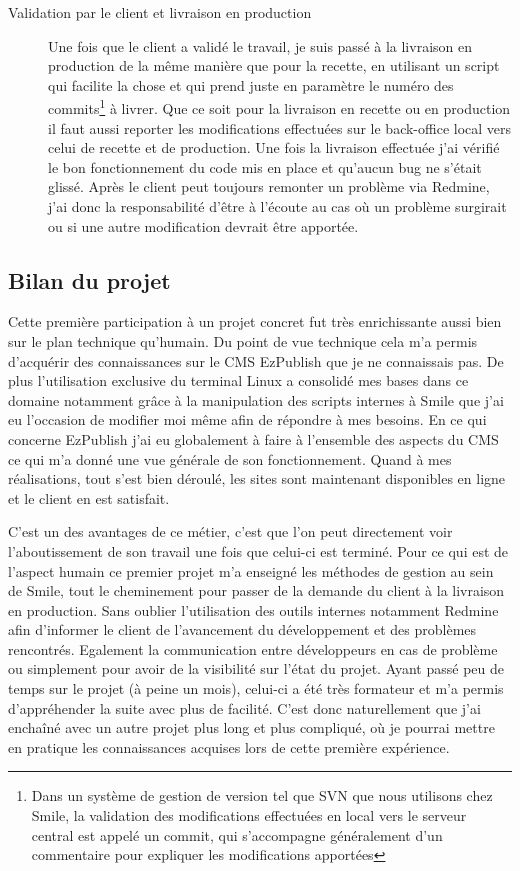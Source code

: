 \documentclass[a4paper,11pt,twoside]{report}
\begin{document}
\begin{description}
	\item[Validation par le client et livraison en production] Une fois que le client a validé le travail, je suis passé à la livraison en production de la même manière que pour la recette, en utilisant un script qui facilite la chose et qui prend juste en paramètre le numéro des commits\footnote{Dans un système de gestion de version tel que SVN que nous utilisons chez Smile, la validation des modifications effectuées en local vers le serveur central est appelé un commit, qui s'accompagne généralement d'un commentaire pour expliquer les modifications apportées} à livrer. Que ce soit pour la livraison en recette ou en production il faut aussi reporter les modifications effectuées sur le back-office local vers celui de recette et de production. Une fois la livraison effectuée j'ai vérifié le bon fonctionnement du code mis en place et qu'aucun bug ne s'était glissé. Après le client peut toujours remonter un problème via Redmine, j'ai donc la responsabilité d'être à l'écoute au cas où un problème surgirait ou si une autre modification devrait être apportée.  
      
      \end{description}
    \subsection*{Bilan du projet}
    Cette première participation à un projet concret fut très enrichissante aussi bien sur le plan technique qu'humain. Du point de vue technique cela m'a permis d'acquérir des connaissances sur le CMS EzPublish que je ne connaissais pas. De plus l'utilisation exclusive du terminal Linux a consolidé mes bases dans ce domaine notamment grâce à la manipulation des scripts internes à Smile que j'ai eu l'occasion de modifier moi même afin de répondre à mes besoins. En ce qui concerne EzPublish j'ai eu globalement à faire à l'ensemble des aspects du CMS ce qui m'a donné une vue générale de son fonctionnement. Quand à mes réalisations, tout s'est bien déroulé, les sites sont maintenant disponibles en ligne et le client en est satisfait. 
    
    C'est un des avantages de ce métier, c'est que l'on peut directement voir l'aboutissement de son travail une fois que celui-ci est terminé. Pour ce qui est de l'aspect humain ce premier projet m'a enseigné les méthodes de gestion au sein de Smile, tout le cheminement pour passer de la demande du client à la livraison en production. Sans oublier l'utilisation des outils internes notamment Redmine afin d'informer le client de l'avancement du développement et des problèmes rencontrés. Egalement la communication entre développeurs en cas de problème ou simplement pour avoir de la visibilité sur l'état du projet. Ayant passé peu de temps sur le projet (à peine un mois), celui-ci a été très formateur et m'a permis d'appréhender la suite avec plus de facilité. C'est donc naturellement que j'ai enchaîné avec un autre projet plus long et plus compliqué, où je pourrai mettre en pratique les connaissances acquises lors de cette première expérience.  
    
\end{document}
